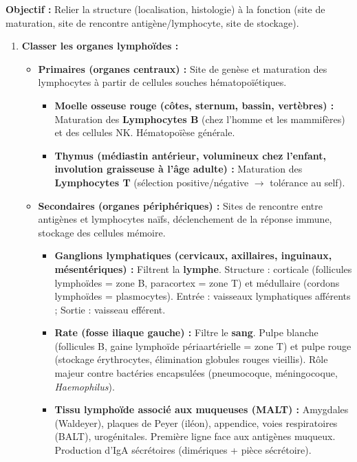 \documentclass[11pt]{article}
\begin{document}
\begin{methode}
    \textbf{Objectif :} Relier la structure (localisation, histologie) à la fonction (site de maturation, site de rencontre antigène/lymphocyte, site de stockage).
    \begin{enumerate}
        \item \textbf{Classer les organes lymphoïdes :}
        \begin{itemize}
            \item \textbf{Primaires (organes centraux) :} Site de genèse et maturation des lymphocytes à partir de cellules souches hématopoïétiques.
                \begin{itemize}
                    \item \textbf{Moelle osseuse rouge (côtes, sternum, bassin, vertèbres) :} Maturation des \textbf{Lymphocytes B} (chez l'homme et les mammifères) et des cellules NK. Hématopoïèse générale.
                    \item \textbf{Thymus (médiastin antérieur, volumineux chez l'enfant, involution graisseuse à l'âge adulte) :} Maturation des \textbf{Lymphocytes T} (sélection positive/négative $\rightarrow$ tolérance au self).
                \end{itemize}
            \item \textbf{Secondaires (organes périphériques) :} Sites de rencontre entre antigènes et lymphocytes naïfs, déclenchement de la réponse immune, stockage des cellules mémoire.
                \begin{itemize}
                    \item \textbf{Ganglions lymphatiques (cervicaux, axillaires, inguinaux, mésentériques) :} Filtrent la \textbf{lymphe}. Structure : corticale (follicules lymphoïdes = zone B, paracortex = zone T) et médullaire (cordons lymphoïdes = plasmocytes). Entrée : vaisseaux lymphatiques afférents ; Sortie : vaisseau efférent.
                    \item \textbf{Rate (fosse iliaque gauche) :} Filtre le \textbf{sang}. Pulpe blanche (follicules B, gaine lymphoïde périaartérielle = zone T) et pulpe rouge (stockage érythrocytes, élimination globules rouges vieillis). Rôle majeur contre bactéries encapsulées (pneumocoque, méningocoque, \emph{Haemophilus}).
                    \item \textbf{Tissu lymphoïde associé aux muqueuses (MALT) :} Amygdales (Waldeyer), plaques de Peyer (iléon), appendice, voies respiratoires (BALT), urogénitales. Première ligne face aux antigènes muqueux. Production d'IgA sécrétoires (dimériques + pièce sécrétoire).

\end{itemize}
\end{itemize}
\end{enumerate}
\end{methode}
\end{document}
